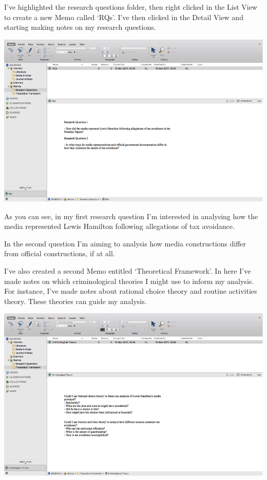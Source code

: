 \documentclass[]{book}
\theoremstyle{definition}
\theoremstyle{definition}
\theoremstyle{definition}
\theoremstyle{remark}
\begin{document}
I've highlighted the research questions folder, then right clicked in
the List View to create a new Memo called `RQs'. I've then clicked in
the Detail View and starting making notes on my research questions.

\includegraphics{imgs/qual_19.png}

As you can see, in my first research question I'm interested in
analysing how the media represented Lewis Hamilton following allegations
of tax avoidance.

In the second question I'm aiming to analysis how media constructions
differ from official constructions, if at all.

I've also created a second Memo entitled `Theoretical Framework'. In
here I've made notes on which criminological theories I might use to
inform my analysis. For instance, I've made notes about rational choice
theory and routine activities theory. These theories can guide my
analysis.

\includegraphics{imgs/qual_20.png}
\end{document}
